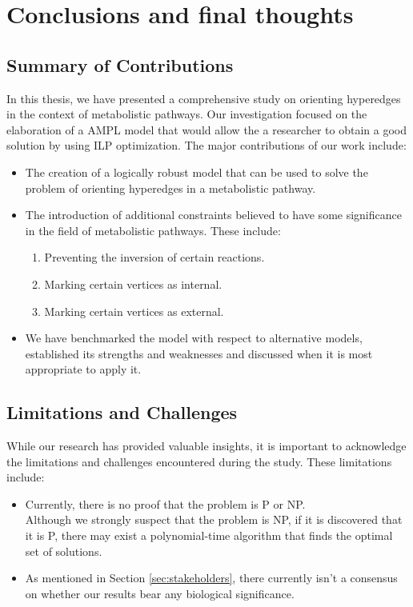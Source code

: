 \section{Conclusions and final thoughts}
\label{sec:conclusions_and_final_thoughts}

\subsection{Summary of Contributions}
In this thesis, we have presented a comprehensive study on orienting hyperedges in the context of metabolistic pathways. 
Our investigation focused on the elaboration of a AMPL model that would allow the a researcher to obtain a good solution by using ILP optimization. 
The major contributions of our work include:

\begin{itemize}
    \item The creation of a logically robust model that can be used to solve the problem of orienting hyperedges in a metabolistic pathway.
    \item The introduction of additional constraints believed to have some significance in the field of metabolistic pathways. These include:
    \begin{enumerate}
        \item Preventing the inversion of certain reactions.
        \item Marking certain vertices as internal.
        \item Marking certain vertices as external.
    \end{enumerate}
    \item We have benchmarked the model with respect to alternative models, established its strengths and weaknesses and discussed when it is most appropriate to apply it.
\end{itemize}


\subsection{Limitations and Challenges}
While our research has provided valuable insights, it is important to acknowledge the limitations and challenges encountered during the study. These limitations include:

\begin{itemize}
    \item Currently, there is no proof that the problem is P or NP. \\
    Although we strongly suspect that the problem is NP, if it is discovered that it is P, there may exist a polynomial-time algorithm that finds the optimal set of solutions.
    \item As mentioned in Section \ref{sec:stakeholders}, there currently isn't a consensus on whether our results bear any biological significance.
\end{itemize}

